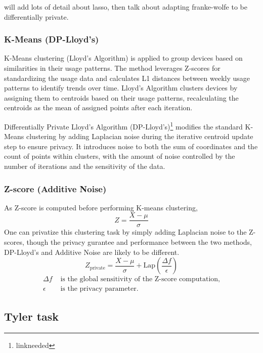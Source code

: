 \documentclass[12pt,letterpaper]{article}
\begin{document}
will add lots of detail about lasso, then talk about adapting franke-wolfe to be differentially private. 

\subsubsection{K-Means (DP-Lloyd's)}
K-Means clustering (Lloyd's Algorithm) is applied to group devices based on similarities in their usage patterns. The method leverages Z-scores for standardizing the usage data and calculates L1 distances between weekly usage patterns to identify trends over time. Lloyd's Algorithm clusters devices by assigning them to centroids based on their usage patterns, recalculating the centroids as the mean of assigned points after each iteration. 

Differentially Private Lloyd's Algorithm (DP-Lloyd's)\footnote{linkneeded} modifies the standard K-Means clustering by adding Laplacian noise during the iterative centroid update step to ensure privacy. It introduces noise to both the sum of coordinates and the count of points within clusters, with the amount of noise controlled by the number of iterations and the sensitivity of the data. 
\subsubsection{Z-score (Additive Noise)}
As Z-score is computed before performing K-means clustering, 
\[
Z = \frac{X - \mu}{\sigma}
\]
One can privatize this clustering task by simply adding Laplacian noise to the Z-scores, though the privacy gurantee and performance between the two methods, DP-Lloyd's and Additive Noise are likely to be different.
\[
Z_{\text{private}} = \frac{X - \mu}{\sigma} + \text{Lap}\left(\frac{\Delta f}{\epsilon}\right)
\]
\begin{equation*}
\begin{aligned}
    \Delta f & \text{ is the global sensitivity of the Z-score computation,} \\
    \epsilon & \text{ is the privacy parameter.}
\end{aligned}
\end{equation*}



\subsection{Tyler task}




\end{document}
